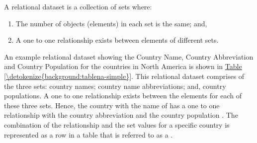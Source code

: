 \documentclass[a4paper,11pt,english]{sphinxmanual}
\begin{document}
A relational dataset is a collection of sets where:
\begin{enumerate}
\def\theenumi{\arabic{enumi}}
\def\labelenumi{\theenumi .}
\makeatletter\def\p@enumii{\p@enumi \theenumi .}\makeatother
\item {} 
The number of objects (elements) in each set is the same; and,

\item {} 
A one to one relationship exists between elements of different sets.

\end{enumerate}

An example relational dataset showing the Country Name, Country Abbreviation and Country Population for the countries in North America is shown in \hyperref[\detokenize{background:tablena-simple}]{Table \ref{\detokenize{background:tablena-simple}}}.  This relational dataset comprises of the three sets: country names; country name abbreviations; and, country populations.  A one to one relationship exists between the elements for each of these three sets.  Hence, the country with the name of  has a one to one relationship with the country abbreviation  and the country population .  The combination of the relationship and the set values for a specific country is represented as a row in a table that is referred to as a .
\end{document}
